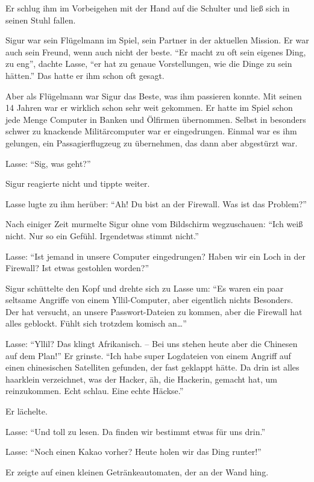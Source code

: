 Er schlug ihm im Vorbeigehen mit der Hand auf die Schulter und ließ sich in seinen Stuhl fallen.

Sigur war sein Flügelmann im Spiel, sein Partner in der aktuellen Mission.
Er war auch sein Freund, wenn auch nicht der beste.
\enquote{Er macht zu oft sein eigenes Ding, zu eng}, dachte Lasse, \enquote{er hat zu genaue Vorstellungen, wie die Dinge zu sein hätten.}
Das hatte er ihm schon oft gesagt.

Aber als Flügelmann war Sigur das Beste, was ihm passieren konnte.
Mit seinen 14 Jahren war er wirklich schon sehr weit gekommen.
Er hatte im Spiel schon jede Menge Computer in Banken und Ölfirmen übernommen.
Selbst in besonders schwer zu knackende Militärcomputer war er eingedrungen.
Einmal war es ihm gelungen, ein Passagierflugzeug zu übernehmen, das dann aber abgestürzt war.

Lasse: \enquote{Sig, was geht?}

Sigur reagierte nicht und tippte weiter.

Lasse lugte zu ihm herüber: \enquote{Ah! Du bist an der Firewall.
Was ist das Problem?}

Nach einiger Zeit murmelte Sigur ohne vom Bildschirm wegzuschauen: \enquote{Ich weiß nicht.
Nur so ein Gefühl.
Irgendetwas stimmt nicht.}

Lasse: \enquote{Ist jemand in unsere Computer eingedrungen?
Haben wir ein Loch in der Firewall?
Ist etwas gestohlen worden?}

Sigur schüttelte den Kopf und drehte sich zu Lasse um: \enquote{Es waren ein paar seltsame Angriffe von einem Yllil-Computer, aber eigentlich nichts Besonders.
Der hat versucht, an unsere Passwort-Dateien zu kommen, aber die Firewall hat alles geblockt.
Fühlt sich trotzdem komisch an\dots}

Lasse: \enquote{Yllil? Das klingt Afrikanisch.
-- Bei uns stehen heute aber die Chinesen auf dem Plan!}
Er grinste.
\enquote{Ich habe super Logdateien von einem Angriff auf einen chinesischen Satelliten gefunden, der fast geklappt hätte.
Da drin ist alles haarklein verzeichnet, was der Hacker, äh, die Hackerin, gemacht hat, um reinzukommen.
Echt schlau.
Eine echte Häckse.} 

Er lächelte.

Lasse: \enquote{Und toll zu lesen.
Da finden wir bestimmt etwas für uns drin.}

Lasse: \enquote{Noch einen Kakao vorher? Heute holen wir das Ding runter!}

Er zeigte auf einen kleinen Getränkeautomaten, der an der Wand hing.

